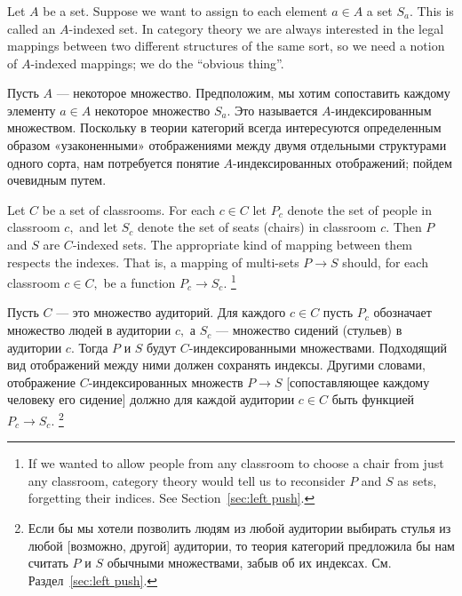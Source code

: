 \documentclass[../main/CT4S-EN-RU]{subfiles}
\begin{document}

\subsubsection{}\label{sec:indexed sets}

\begin{blockENG}
Let $A$ be a set. Suppose we want to assign to each element $a\in A$ a set $S_a.$ This is called an $A$-indexed set. In category theory we are always interested in the legal mappings between two different structures of the same sort, so we need a notion of $A$-indexed mappings; we do the “obvious thing”.
\end{blockENG}

\begin{blockRUS}
Пусть $A$ — некоторое множество. Предположим, мы хотим сопоставить каждому элементу $a\in A$ некоторое множество $S_a.$ Это называется $A$-индексированным множеством. Поскольку в теории категорий всегда интересуются определенным образом «узаконенными» отображениями между двумя отдельными структурами одного сорта, нам потребуется понятие $A$-индексированных отображений; пойдем очевидным путем. 
\end{blockRUS}

\begin{exampleENG}\label{ex:classroom seats}
Let $C$ be a set of classrooms. For each $c\in C$ let $P_c$ denote the set of people in classroom $c,$ and let $S_c$ denote the set of seats (chairs) in classroom $c.$ Then $P$ and $S$ are $C$-indexed sets. The appropriate kind of mapping between them respects the indexes. That is, a mapping of multi-sets $P{→} S$ should, for each classroom $c\in C,$ be a function $P_c{→} S_c.$%
\footnote{If we wanted to allow people from any classroom to choose a chair from just any classroom, category theory would tell us to reconsider $P$ and $S$ as sets, forgetting their indices. See Section~\ref{sec:left push}.}
\end{exampleENG}

\begin{exampleRUS}\label{ex:classroom seats}
Пусть $C$ — это множество аудиторий. Для каждого $c\in C$ пусть $P_c$ обозначает множество людей в аудитории $c,$ а $S_c$ — множество сидений (стульев) в аудитории $c.$ Тогда $P$ и $S$ будут $C$-индексированными множествами. Подходящий вид отображений между ними должен сохранять индексы. Другими словами, отображение $C$-индексированных множеств $P{→} S$ [сопоставляющее каждому человеку его сидение] должно для каждой аудитории $c\in C$ быть функцией $P_c{→} S_c.$%
\footnote{Если бы мы хотели позволить людям из любой аудитории выбирать стулья из любой [возможно, другой] аудитории, то теория категорий предложила бы нам считать $P$ и $S$ обычными множествами, забыв об их индексах. См. Раздел~\ref{sec:left push}.}
\end{exampleRUS}
\end{document}
